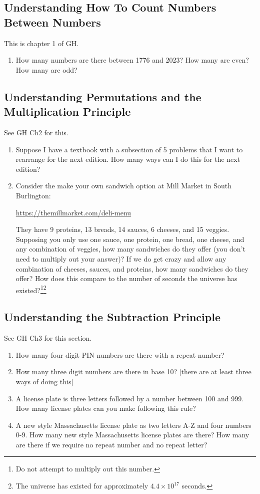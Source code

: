 \documentclass[11pt, letterpaper]{article}
\begin{document}
\subsection{Understanding How To Count Numbers Between Numbers}
This is chapter 1 of GH. 
\begin{enumerate}
	\item How many numbers are there between 1776 and 2023? How many are even? How many are odd?  
\end{enumerate} 
\subsection{Understanding Permutations and the Multiplication Principle}
See GH Ch2 for this. 
\begin{enumerate}
	\item Suppose I have a textbook with a subsection of 5 problems that I want to rearrange for the next edition. How many ways can I do this for the next edition?
	\item Consider the make your own sandwich option at Mill Market in South Burlington: \begin{center}
		\url{https://themillmarket.com/deli-menu}
	\end{center}
    They have 9 proteins, 13 breads, 14 sauces, 6 cheeses, and 15 veggies. 
    Supposing you only use one sauce, one protein, one bread, one cheese, and any combination of veggies, how many sandwiches do they offer (you don't need to multiply out your answer)?
    If we do get crazy and allow any combination of cheeses, sauces, and proteins, how many sandwiches do they offer? How does this compare to the number of seconds the universe has existed?\footnote{Do not attempt to multiply out this number.}\footnote{The universe has existed for approximately $4.4\times 10^{17}$ seconds.}
\end{enumerate}
\subsection{Understanding the Subtraction Principle}
See GH Ch3 for this section.
\begin{enumerate}
	\item How many four digit PIN numbers are there with a repeat number?
	\item How many three digit numbers are there in base 10? [there are at least three ways of doing this]
	\item A license plate is three letters followed by a number between 100 and 999. How many license plates can you make following this rule? 
	\item A new style Massachusetts license plate as two letters A-Z and four numbers 0-9. How many new style Massachusetts license plates are there? How many are there if we require no repeat number and no repeat letter?
\end{enumerate}
\end{document}
